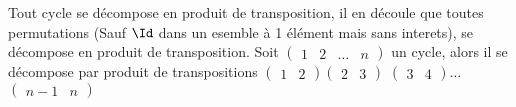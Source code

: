 \begin{theoreme}
    Tout cycle se décompose en produit de transposition, il en découle que toutes permutations (Sauf $\Id$ dans un esemble à 1 élément mais sans interets), se décompose en produit de transposition.
    \tcblower
    Soit $\begin{pmatrix}
        1 & 2 & \dots & n
        \end{pmatrix}$ un cycle, alors il se décompose par produit de transpositions $\begin{pmatrix}
            1 & 2
            \end{pmatrix}$$\begin{pmatrix}
                2 & 3
                \end{pmatrix}$
                $\begin{pmatrix}
                    3 & 4
                    \end{pmatrix}\dots$$\begin{pmatrix}
                        n-1 & n
                        \end{pmatrix}$
\end{theoreme}
